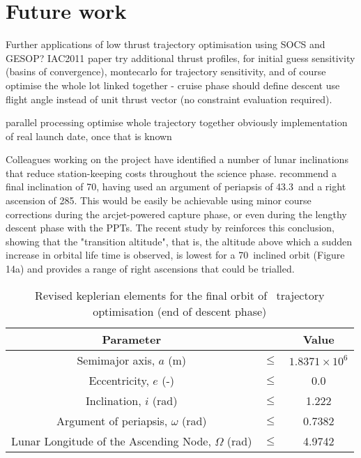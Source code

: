 \section{Future work} \label{sec:Future-work}
Further applications of low thrust trajectory optimisation using SOCS and GESOP? IAC2011 paper
try additional thrust profiles, for initial guess sensitivity (basins of convergence), montecarlo for trajectory sensitivity, and of course optimise the whole lot linked together - cruise phase should define descent
use flight angle instead of unit thrust vector (no constraint evaluation required).

parallel processing
optimise whole trajectory together
obviously implementation of real launch date, once that is known

Colleagues working on the project have identified a number of lunar inclinations that reduce station-keeping costs throughout the science phase. \textcite{Zeile2010} recommend a final inclination of 70\degrees, having used an argument of periapsis of 43.3\degrees\ and a right ascension of 285\degrees. This would be easily be achievable using minor course corrections during the arcjet-powered capture phase, or even during the lengthy descent phase with the PPTs. The recent study by \textcite{Gupta2011} reinforces this conclusion, showing that the "transition altitude", that is, the altitude above which a sudden increase in orbital life time is observed, is lowest for a 70\degrees\ inclined orbit (Figure 14a) and provides a range of right ascensions that could be trialled.

\begin{table}[h]
\caption{Revised keplerian elements for the final orbit of \BW\ trajectory optimisation (end of descent phase)}
\label{tab:Phase-5-constraints-revised}
\begin{center}
\begin{tabular} {ccc}\toprule
Parameter && Value\\\midrule
Semimajor axis, $a$ (m) &$\le$& $1.8371\times 10^6$\\
Eccentricity, $e$ (-) &$\le$& 0.0\\
Inclination, $i$ (rad) &$\le$& 1.222\\
Argument of periapsis, $\omega$ (rad) &$\le$& 0.7382 \\
Lunar Longitude of the Ascending Node, $\Omega$ (rad) &$\le$& 4.9742 \\\bottomrule
\end{tabular}
\end{center}
\end{table}

